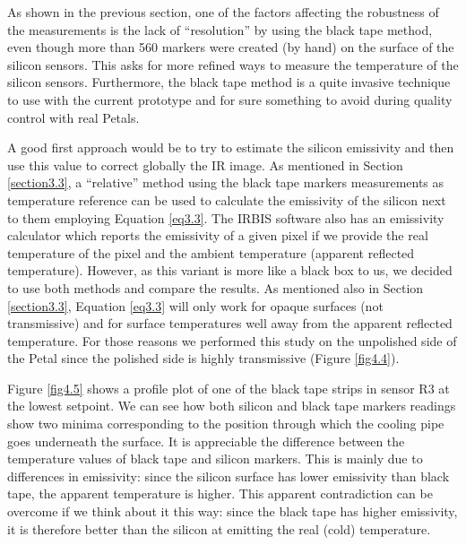 		As shown in the previous section, one of the factors affecting the robustness of the measurements is the lack of “resolution” by using the black tape method, even though more than 560 markers were created (by hand) on the surface of the silicon sensors. This asks for more refined ways to measure the temperature of the silicon sensors. Furthermore, the black tape method is a quite invasive technique to use with the current prototype and for sure something to avoid during quality control with real Petals.
		
		A good first approach would be to try to estimate the silicon emissivity and then use this value to correct globally the IR image. As mentioned in Section \ref{section3.3}, a “relative” method using the black tape markers measurements as temperature reference can be used to calculate the emissivity of the silicon next to them employing Equation \ref{eq3.3}. The IRBIS software also has an emissivity calculator which reports the emissivity of a given pixel if we provide the real temperature of the pixel and the ambient temperature (apparent reflected temperature). However, as this variant is more like a black box to us, we decided to use both methods and compare the results. As mentioned also in Section \ref{section3.3}, Equation \ref{eq3.3} will only work for opaque surfaces (not transmissive) and for surface temperatures well away from the apparent reflected temperature. For those reasons we performed this study on the unpolished side of the Petal since the polished side is highly transmissive (Figure \ref{fig4.4}).
		
		Figure \ref{fig4.5} shows a profile plot of one of the black tape strips in sensor R3 at the lowest setpoint. We can see how both silicon and black tape markers readings show two minima corresponding to the position through which the cooling pipe goes underneath the surface. It is appreciable the difference between the temperature values of black tape and silicon markers. This is mainly due to differences in emissivity: since the silicon surface has lower emissivity than black tape, the apparent temperature is higher. This apparent contradiction can be overcome if we think about it this way: since the black tape has higher emissivity, it is therefore better than the silicon at emitting the real (cold) temperature.
		
